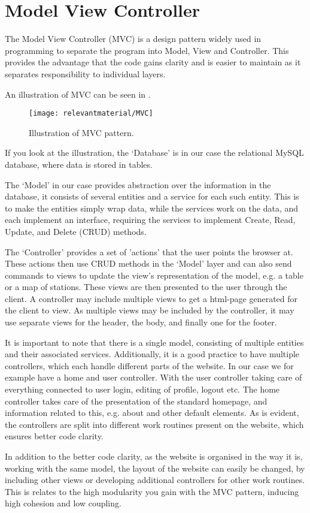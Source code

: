 \section{Model View Controller}
The Model View Controller (MVC) is a design pattern widely used in programming to separate the program into Model, View and Controller. This provides the advantage that the code gains clarity and is easier to maintain as it separates responsibility to individual layers.

An illustration of MVC can be seen in .
\begin{figure}[h]
	\centering
	\texttt{[image: relevantmaterial/MVC]}
	\caption{Illustration of MVC pattern.}\label{fig:MVC}
\end{figure}

If you look at the illustration, the `Database' is in our case the relational MySQL database, where data is stored in tables.

The `Model' in our case provides abstraction over the information in the database, it consists of several entities and a service for each such entity.
This is to make the entities simply wrap data, while the services work on the data, and each implement an interface, requiring the services to implement Create, Read, Update, and Delete (CRUD) methods.

The `Controller' provides a set of 'actions' that the user points the browser at. These actions then use CRUD methods in the `Model' layer and can also send commands to views to update the view's representation of the model, e.g. a table or a map of stations. These views are then presented to the user through the client.
A controller may include multiple views to get a html-page generated for the client to view.
As multiple views may be included by the controller, it may use separate views for the header, the body, and finally one for the footer.

It is important to note that there is a single model, consisting of multiple entities and their associated services.
Additionally, it is a good practice to have multiple controllers, which each handle different parts of the website.
In our case we for example have a home and user controller.
With the user controller taking care of everything connected to user login, editing of profile, logout etc.
The home controller takes care of the presentation of the standard homepage, and information related to this, e.g. about and other default elements.
As is evident, the controllers are split into different work routines present on the website, which ensures better code clarity.

In addition to the better code clarity, as the website is organised in the way it is, working with the same model, the layout of the website can easily be changed, by including other views or developing additional controllers for other work routines.
This is relates to the high modularity you gain with the MVC pattern, inducing high cohesion and low coupling.